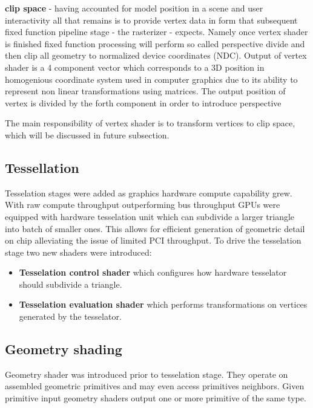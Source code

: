 \textbf{clip space} - having accounted for model position in a scene and user interactivity all that remains is to provide vertex data in form that subsequent fixed function pipeline stage - the rasterizer - expects.
Namely once vertex shader is finished fixed function processing will perform so called perspective divide and then clip all geometry to normalized device coordinates (NDC).
Output of vertex shader is a 4 component vector which corresponds to a 3D position in homogenious coordinate system used in computer graphics due to its ability to represent non linear transformations using matrices.
The output position of vertex is divided by the forth component in order to introduce perspective 


The main responsibility of vertex shader is to transform vertices to clip space, which will be discussed in future subsection. %

\subsection{Tessellation}

Tesselation stages were added as graphics hardware compute capability grew. With raw compute throughput outperforming bus throughput GPUs were equipped with hardware
tesselation unit which can subdivide a larger triangle into batch of smaller ones. This allows for efficient generation of geometric detail on chip alleviating the 
issue of limited PCI throughput.
To drive the tesselation stage two new shaders were introduced:
\begin{itemize}
    \item \textbf{Tesselation control shader} which configures how hardware tesselator should subdivide a triangle.
    \item \textbf{Tesselation evaluation shader} which performs transformations on vertices generated by the tesselator.
\end{itemize}

\subsection{Geometry shading}

Geometry shader was introduced prior to tesselation stage. They operate on assembled geometric primitives and may even access primitives neighbors.
Given primitive input geometry shaders output one or more primitive of the same type.

